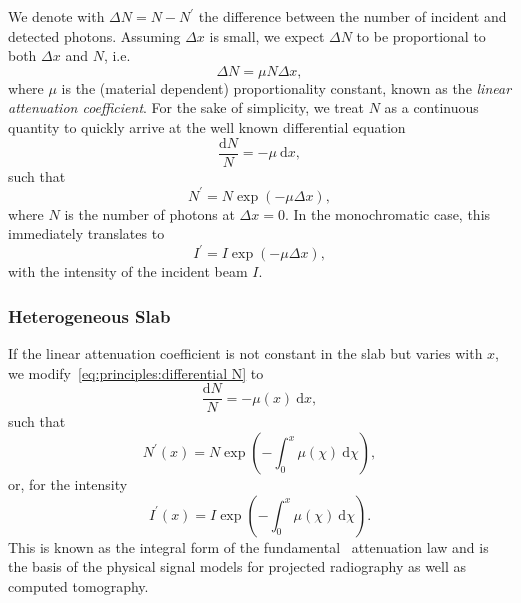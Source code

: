\documentclass[../ml-tct.tex]{subfiles}
\begin{document}
We denote with \( \Delta N = N - N^\prime \) the difference between the number of incident and detected photons.
Assuming \( \Delta x \) is small, we expect \( \Delta N \) to be proportional to both \( \Delta x \) and \( N \), i.e.
\begin{equation}
	\Delta N = \mu N \Delta x,
\end{equation}
where \( \mu \) is the (material dependent) proportionality constant, known as the \emph{linear attenuation coefficient}.
For the sake of simplicity, we treat \( N \) as a continuous quantity to quickly arrive at the well known differential equation
\begin{equation}
	\frac{\mathrm{d}N}{N} = -\mu\ \mathrm{d} x,%
	\label{eq:principles:differential N}
\end{equation}
such that
\begin{equation}
	N^\prime = N \exp{(-\mu\Delta x)},
\end{equation}
where \( N \) is the number of photons at \( \Delta x = 0\).
In the monochromatic case, this immediately translates to
\begin{equation}
	I^\prime = I \exp{(-\mu\Delta x)},
\end{equation}
with the intensity of the incident beam \( I \).
\subsubsection{Heterogeneous Slab}
If the linear attenuation coefficient is not constant in the slab but varies with \( x \), we modify~\cref{eq:principles:differential N} to
\begin{equation}
	\frac{\mathrm{d} N}{N} = -\mu(x)\ \mathrm{d} x,
\end{equation}
such that
\begin{equation}
	N^\prime(x) = N \exp{\left( -\int_0^x \mu(\chi)\ \mathrm{d} \chi \right)},
\end{equation}
or, for the intensity
\begin{equation}
	I^\prime(x) = I \exp{\left( -\int_0^x \mu(\chi)\ \mathrm{d} \chi \right)}.
\end{equation}
This is known as the integral form of the fundamental \xray\ attenuation law and is the basis of the physical signal models for projected radiography as well as computed tomography.
\end{document}
